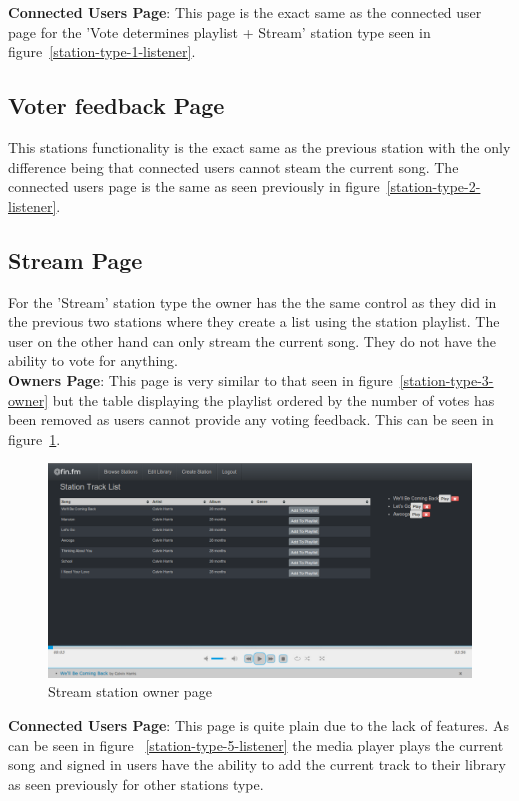 \documentclass[a4paper, 12pt]{report}
\begin{document}
\textbf{Connected Users Page}: This page is the exact same as the connected user page for the 'Vote determines playlist + Stream' station type seen in figure~\ref{station-type-1-listener}.

\subsection{Voter feedback Page}
This stations functionality is the exact same as the previous station with the only difference being that connected users cannot steam the current song. The connected users page is the same as seen previously in figure~\ref{station-type-2-listener}.

\subsection{Stream Page}
For the 'Stream' station type the owner has the the same control as they did in the previous two stations where they create a list using the station playlist. The user on the other hand can only stream the current song. They do not have the ability to vote for anything.\\

\textbf{Owners Page}: This page is very similar to that seen in figure~\ref{station-type-3-owner} but the table displaying the playlist ordered by the number of votes has been removed as users cannot provide any voting feedback. This can be seen in figure~\ref{station-type-5-owner}.

\begin{figure}[H]
  \centering
    \includegraphics[width=1.0\textwidth]{screenshots/station-type-5-owner.png}
    \caption{Stream station owner page}
    \label{station-type-5-owner}
\end{figure}

\textbf{Connected Users Page}: This page is quite plain due to the lack of features. As can be seen in figure ~\ref{station-type-5-listener} the media player plays the current song and signed in users have the ability to add the current track to their library as seen previously for other stations type.
\end{document}
